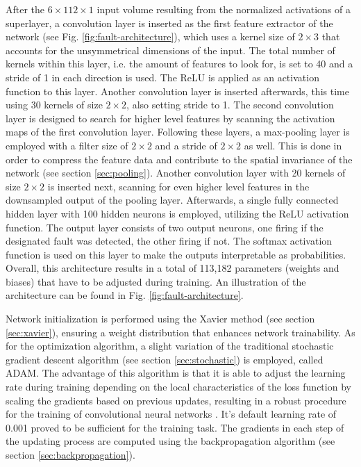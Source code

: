 After the \(6 \times 112 \times 1\) input volume resulting from the
normalized activations of a superlayer, a convolution layer
is inserted as the first feature extractor of the network (see
Fig. \ref{fig:fault-architecture}), which
uses a kernel size of \(2 \times 3\) that accounts for the
unsymmetrical dimensions of the input. The total number of kernels
within this layer, i.e. the amount of features to look for, is set to
40 and a stride of 1 in each direction is used. The ReLU is applied
as an activation function to this layer. Another convolution layer is
inserted afterwards, this time using 30 kernels of size \(2 \times
2\), also setting stride to 1. The second convolution layer is
designed to search for higher level features by scanning the
activation maps of the first convolution layer.
Following these layers, a max-pooling layer is
employed with a filter size of \(2 \times 2\) and a stride of \(2
\times 2\) as well. This is done in order to compress the feature data
and contribute to the spatial invariance of the network (see section
\ref{sec:pooling}). Another convolution layer with 20
kernels of size \(2 \times 2\) is inserted next, scanning for even
higher level features in the downsampled output of the pooling
layer. Afterwards, a single fully
connected hidden layer with 100 hidden neurons is employed, utilizing
the ReLU activation function. The output layer consists of two
output neurons, one firing if the designated fault was detected, the
other firing if not. The softmax activation function is used on this
layer to make the outputs interpretable as probabilities. Overall, this
architecture results in a total of 113,182 parameters (weights and
biases) that have to be adjusted during training. An illustration of
the architecture can be found in Fig. \ref{fig:fault-architecture}.

Network initialization is performed using the Xavier
method (see section \ref{sec:xavier}), ensuring a weight distribution
that enhances network trainability. As for the optimization algorithm,
a slight variation of the traditional stochastic gradient
descent algorithm (see section \ref{sec:stochastic}) is employed,
called ADAM. The advantage of this algorithm is that it is able to
adjust the learning rate during training depending on the local
characteristics of the loss function by scaling the gradients based on
previous updates, resulting in a robust procedure for the training of
convolutional neural networks \cite{adam}. It's default learning rate
of 0.001 proved to be sufficient for the training task. The gradients
in each step of the updating process are computed using the
backpropagation algorithm (see section \ref{sec:backpropagation}).

